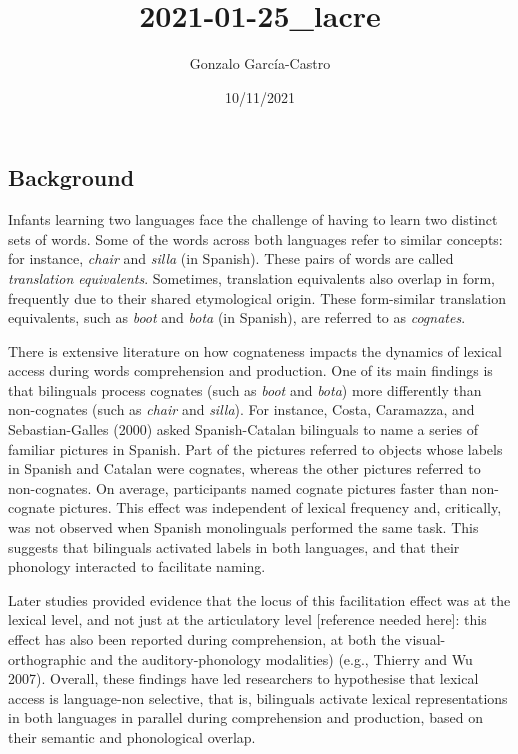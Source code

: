 \documentclass[
]{article}
\title{2021-01-25\_lacre}
\author{Gonzalo García-Castro}
\date{10/11/2021}
\begin{document}
\maketitle

\hypertarget{background}{%
\subsection{Background}\label{background}}

Infants learning two languages face the challenge of having to learn two
distinct sets of words. Some of the words across both languages refer to
similar concepts: for instance, \emph{chair} and \emph{silla} (in
Spanish). These pairs of words are called \emph{translation
equivalents}. Sometimes, translation equivalents also overlap in form,
frequently due to their shared etymological origin. These form-similar
translation equivalents, such as \emph{boot} and \emph{bota} (in
Spanish), are referred to as \emph{cognates}.

There is extensive literature on how cognateness impacts the dynamics of
lexical access during words comprehension and production. One of its
main findings is that bilinguals process cognates (such as \emph{boot}
and \emph{bota}) more differently than non-cognates (such as
\emph{chair} and \emph{silla}). For instance, Costa, Caramazza, and
Sebastian-Galles (2000) asked Spanish-Catalan bilinguals to name a
series of familiar pictures in Spanish. Part of the pictures referred to
objects whose labels in Spanish and Catalan were cognates, whereas the
other pictures referred to non-cognates. On average, participants named
cognate pictures faster than non-cognate pictures. This effect was
independent of lexical frequency and, critically, was not observed when
Spanish monolinguals performed the same task. This suggests that
bilinguals activated labels in both languages, and that their phonology
interacted to facilitate naming.

Later studies provided evidence that the locus of this facilitation
effect was at the lexical level, and not just at the articulatory level
{[}reference needed here{]}: this effect has also been reported during
comprehension, at both the visual-orthographic and the
auditory-phonology modalities) (e.g., Thierry and Wu 2007). Overall,
these findings have led researchers to hypothesise that lexical access
is language-non selective, that is, bilinguals activate lexical
representations in both languages in parallel during comprehension and
production, based on their semantic and phonological overlap.
\end{document}
